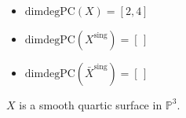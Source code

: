 \documentclass{amsart}
\begin{document}






\begin{example}\leavevmode
\begin{itemize}
    \item $\mathrm{dimdegPC}(X) = [2,4]$
    \item \(\mathrm{dimdegPC}(X^{\mathrm{sing}}) = [\,]\)
    \item \(\mathrm{dimdegPC}(\bar{X}^{\mathrm{sing}}) = [\,]\)
\end{itemize}
 
\(X\) is a smooth quartic surface in \(\mathbb{P}^3\). 
\end{example}



\end{document}
